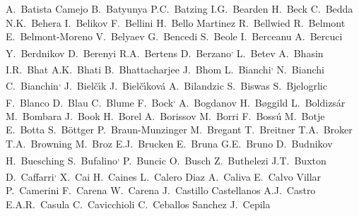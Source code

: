 \begin{flushleft}
A.~Batista Camejo\And
B.~Batyunya\And
P.C.~Batzing\And
I.G.~Bearden\And
H.~Beck\And
C.~Bedda\And
N.K.~Behera\And
I.~Belikov\And
F.~Bellini\And
H.~Bello Martinez\And
R.~Bellwied\And
R.~Belmont\And
E.~Belmont-Moreno\And
V.~Belyaev\And
G.~Bencedi\And
S.~Beole\And
I.~Berceanu\And
A.~Bercuci\And
Y.~Berdnikov\And
D.~Berenyi\And
R.A.~Bertens\And
D.~Berzano\textsuperscript{,}\And
L.~Betev\And
A.~Bhasin\And
I.R.~Bhat\And
A.K.~Bhati\And
B.~Bhattacharjee\And
J.~Bhom\And
L.~Bianchi\textsuperscript{,}\And
N.~Bianchi\And
C.~Bianchin\textsuperscript{,}\And
J.~Biel\v{c}\'{\i}k\And
J.~Biel\v{c}\'{\i}kov\'{a}\And
A.~Bilandzic\And
S.~Biswas\And
S.~Bjelogrlic\And
F.~Blanco\And
D.~Blau\And
C.~Blume\And
F.~Bock\textsuperscript{,}\And
A.~Bogdanov\And
H.~B{\o}ggild\And
L.~Boldizs\'{a}r\And
M.~Bombara\And
J.~Book\And
H.~Borel\And
A.~Borissov\And
M.~Borri\And
F.~Boss\'u\And
M.~Botje\And
E.~Botta\And
S.~B\"{o}ttger\And
P.~Braun-Munzinger\And
M.~Bregant\And
T.~Breitner\And
T.A.~Broker\And
T.A.~Browning\And
M.~Broz\And
E.J.~Brucken\And
E.~Bruna\And
G.E.~Bruno\And
D.~Budnikov\And
H.~Buesching\And
S.~Bufalino\textsuperscript{,}\And
P.~Buncic\And
O.~Busch\And
Z.~Buthelezi\And
J.T.~Buxton\And
D.~Caffarri\textsuperscript{,}\And
X.~Cai\And
H.~Caines\And
L.~Calero Diaz\And
A.~Caliva\And
E.~Calvo Villar\And
P.~Camerini\And
F.~Carena\And
W.~Carena\And
J.~Castillo Castellanos\And
A.J.~Castro\And
E.A.R.~Casula\And
C.~Cavicchioli\And
C.~Ceballos Sanchez\And
J.~Cepila\And

\end{flushleft}
